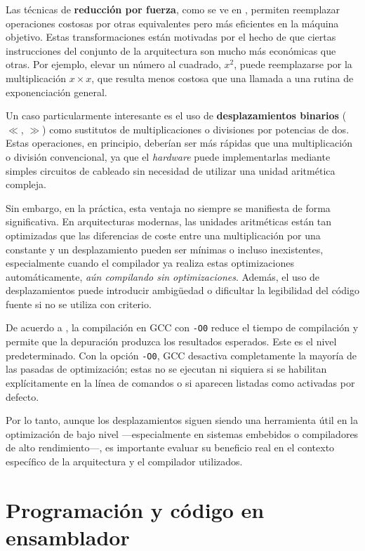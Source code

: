 \documentclass[11pt,a4paper,twoside]{article}
\theoremstyle{definition}
\begin{document}
	Las técnicas de \textbf{reducción por fuerza}, como se ve en \cite{aho}, permiten reemplazar operaciones costosas por otras equivalentes pero más eficientes en la máquina objetivo. Estas transformaciones están motivadas por el hecho de que ciertas instrucciones del conjunto de la arquitectura son mucho más económicas que otras. Por ejemplo, elevar un número al cuadrado, $x^2$, puede reemplazarse por la multiplicación $x \times x$, que resulta menos costosa que una llamada a una rutina de exponenciación general.
	
	Un caso particularmente interesante es el uso de \textbf{desplazamientos binarios} ($\ll$, $\gg$) como sustitutos de multiplicaciones o divisiones por potencias de dos. Estas operaciones, en principio, deberían ser más rápidas que una multiplicación o división convencional, ya que el \textit{hardware} puede implementarlas mediante simples circuitos de cableado sin necesidad de utilizar una unidad aritmética compleja.
	
	Sin embargo, en la práctica, esta ventaja no siempre se manifiesta de forma significativa. En arquitecturas modernas, las unidades aritméticas están tan optimizadas que las diferencias de coste entre una multiplicación por una constante y un desplazamiento pueden ser mínimas o incluso inexistentes, especialmente cuando el compilador ya realiza estas optimizaciones automáticamente, \textit{aún compilando sin optimizaciones}. Además, el uso de desplazamientos puede introducir ambigüedad o dificultar la legibilidad del código fuente si no se utiliza con criterio.
	
	De acuerdo a \cite{gcc}, la compilación en GCC con \texttt{-O0} reduce el tiempo de compilación y permite que la depuración produzca los resultados esperados. Este es el nivel predeterminado. Con la opción \texttt{-O0}, GCC desactiva completamente la mayoría de las pasadas de optimización; estas no se ejecutan ni siquiera si se habilitan explícitamente en la línea de comandos o si aparecen listadas como activadas por defecto.
	
	Por lo tanto, aunque los desplazamientos siguen siendo una herramienta útil en la optimización de bajo nivel ---especialmente en sistemas embebidos o compiladores de alto rendimiento---, es importante evaluar su beneficio real en el contexto específico de la arquitectura y el compilador utilizados.
	
	
	\section{Programación y código en ensamblador}
	
\end{document}
